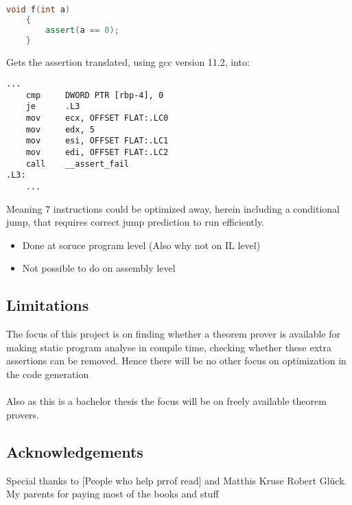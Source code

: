 \begin{lstlisting}[language=c++]
    void f(int a)
    {
        assert(a == 0);
    }
\end{lstlisting}
\noindent
Gets the assertion translated, using gcc version 11.2, into:

\begin{lstlisting}[language={[x86masm]Assembler}]
    ...
    cmp     DWORD PTR [rbp-4], 0
    je      .L3
    mov     ecx, OFFSET FLAT:.LC0
    mov     edx, 5
    mov     esi, OFFSET FLAT:.LC1
    mov     edi, OFFSET FLAT:.LC2
    call    __assert_fail
.L3:
    ...
\end{lstlisting}
\noindent
Meaning 7 instructions could be optimized away, herein including a conditional jump,
that requires correct jump prediction to run efficiently.

\begin{itemize}
    \item Done at soruce program level (Also why not on IL level)
    \item Not possible to do on assembly level
\end{itemize}

\subsection{Limitations \ms}
The focus of this project is on finding whether a theorem prover is available for making static
program analyse in compile time, checking whether these extra assertions can be removed. Hence
there will be no other focus on optimization in the code generation
\\
\\
Also as this is a bachelor thesis the focus will be on freely available theorem provers.

\subsection{Acknowledgements \ms}
Special thanks to [People who help prrof read] and Matthis Kruse
Robert Glück.
My parents for paying most of the books and stuff